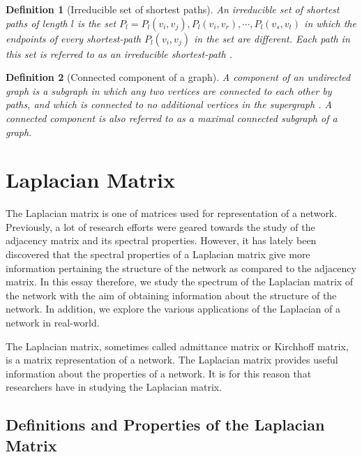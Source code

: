 \documentclass[10pt,a4paper]{article}
\newtheorem{defn}{Definition}
\begin{document}
\begin{defn}[Irreducible set of shortest paths]
	An irreducible set of shortest paths of length $l$ is the set $P_l ={P_l(v_i,v_j),P_l(v_i,v_r),\cdots, P_l(v_s,v_t)}$ in which the endpoints of every shortest-path $P_l(v_i,v_j)$ in the set are different.
	Each path in this set is referred to as an irreducible shortest-path \citep{estrada2012path}.\end{defn}

\begin{defn}[Connected component of a graph]
	A component of an undirected graph is a subgraph in which any two vertices are connected to each other by paths, and which is connected to no additional vertices in the supergraph \citep{newman2010networks}. 
	A connected component is also referred to as a maximal connected subgraph of a graph.
\end{defn}


\section{Laplacian Matrix}
The Laplacian matrix is one of matrices used for representation of a network. Previously, a lot of research efforts were geared towards the study of the adjacency matrix and its spectral properties. However, it has lately been discovered that the spectral properties of a Laplacian matrix give more information pertaining the structure of the network as compared to the adjacency matrix. In this essay therefore, we study the spectrum of the Laplacian matrix of the network with the aim of obtaining information about the structure of the network. In addition, we explore the various applications of the Laplacian of a network in real-world.

The Laplacian matrix, sometimes called admittance matrix or Kirchhoff matrix, is a matrix representation of a network. The Laplacian matrix provides useful information about the properties of a network. 
It is for this reason that researchers have in studying the Laplacian matrix.

\subsection{Definitions and Properties of the Laplacian Matrix}
\end{document}
